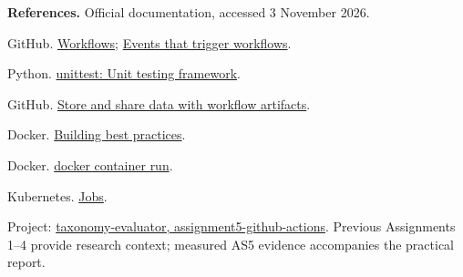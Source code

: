 \noindent\textbf{References.} Official documentation, accessed 3 November 2026.
\begin{enumerate}[label={[\arabic*]}]
\item GitHub. \href{https://docs.github.com/en/actions/concepts/workflows-and-actions/workflows}{Workflows}; \href{https://docs.github.com/en/actions/reference/workflows-and-actions/events-that-trigger-workflows}{Events that trigger workflows}.
\item Python. \href{https://docs.python.org/3/library/unittest.html}{unittest: Unit testing framework}.
\item GitHub. \href{https://docs.github.com/en/actions/tutorials/store-and-share-data}{Store and share data with workflow artifacts}.
\item Docker. \href{https://docs.docker.com/build/building/best-practices/}{Building best practices}.
\item Docker. \href{https://docs.docker.com/reference/cli/docker/container/run/}{docker container run}.
\item Kubernetes. \href{https://kubernetes.io/docs/concepts/workloads/controllers/job/}{Jobs}.
\end{enumerate}
\noindent Project: \href{https://github.com/thgank/taxonomy-evaluator/tree/assignment5-github-actions}{taxonomy-evaluator, assignment5-github-actions}. Previous Assignments 1--4 provide research context; measured AS5 evidence accompanies the practical report.

